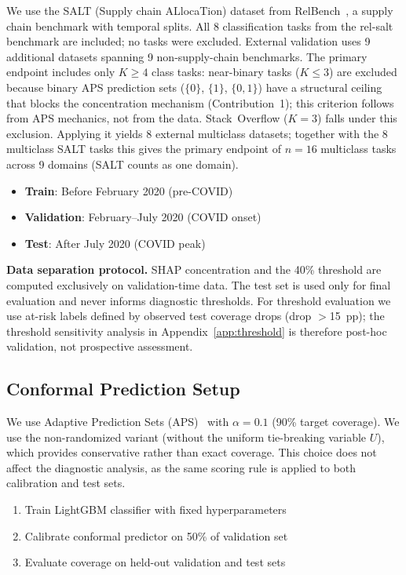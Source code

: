 \documentclass{uai2026} %
\begin{document}
We use the SALT (Supply chain ALlocaTion) dataset from RelBench~\citep{fey2024relbench}, a supply chain benchmark with temporal splits. All 8 classification tasks from the rel-salt benchmark are included; no tasks were excluded.
External validation uses 9 additional datasets spanning 9 non-supply-chain benchmarks. The primary endpoint includes only $K \geq 4$ class tasks: near-binary tasks ($K \leq 3$) are excluded because binary APS prediction sets ($\{0\}$, $\{1\}$, $\{0,1\}$) have a structural ceiling that blocks the concentration mechanism (Contribution~1); this criterion follows from APS mechanics, not from the data. Stack~Overflow ($K=3$) falls under this exclusion. Applying it yields 8 external multiclass datasets; together with the 8 multiclass SALT tasks this gives the primary endpoint of $n=16$ multiclass tasks across 9 domains (SALT counts as one domain).
\begin{itemize}
    \item \textbf{Train}: Before February 2020 (pre-COVID)
    \item \textbf{Validation}: February--July 2020 (COVID onset)
    \item \textbf{Test}: After July 2020 (COVID peak)
\end{itemize}

\noindent\textbf{Data separation protocol.} SHAP concentration and the 40\% threshold are computed exclusively on validation-time data. The test set is used only for final evaluation and never informs diagnostic thresholds. For threshold evaluation we use at-risk labels defined by observed test coverage drops (drop $>$15~pp); the threshold sensitivity analysis in Appendix~\ref{app:threshold} is therefore post-hoc validation, not prospective assessment.

\subsection{Conformal Prediction Setup}

We use Adaptive Prediction Sets (APS)~\citep{romano2020classification} with $\alpha = 0.1$ (90\% target coverage). We use the non-randomized variant (without the uniform tie-breaking variable $U$), which provides conservative rather than exact coverage. This choice does not affect the diagnostic analysis, as the same scoring rule is applied to both calibration and test sets.
\begin{enumerate}
    \item Train LightGBM classifier with fixed hyperparameters
    \item Calibrate conformal predictor on 50\% of validation set
    \item Evaluate coverage on held-out validation and test sets
\end{enumerate}
\end{document}
